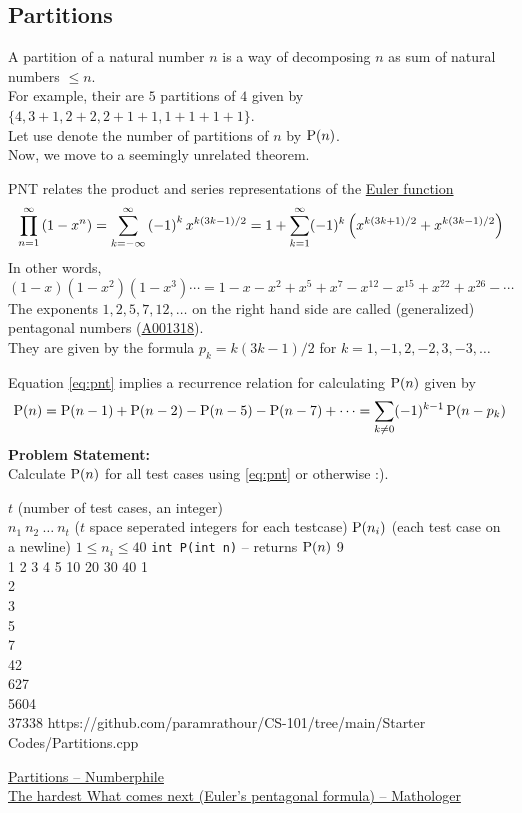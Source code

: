 \documentclass[../../Problems]{subfiles}
\begin{document}
\subsection{Partitions}
A partition of a natural number $n$ is a way of decomposing $n$ as sum of natural numbers $\leq n$.\\
For example, their are $5$ partitions of $4$ given by $\{4, 3+1, 2+2, 2+1+1, 1+1+1+1\}$.\\
Let use denote the number of partitions of $n$ by $\operatorname{P}(n)$.\\
Now, we move to a seemingly unrelated theorem.
\begin{theorem}
	PNT relates the product and series representations of the \href{https://en.wikipedia.org/wiki
	/Euler_function}{Euler function}
	\begin{equation}{\label{eq:pnt}}
		\prod_{n=1}^{\infty}\left(1-x^{n}\right)=\sum_{k=-\infty }^{\infty }\left(-1\right)^{k}x^{k\left(3k-1\right)/2}=1+\sum _{k=1}^{\infty }(-1)^{k}\left(x^{k(3k+1)/2}+x^{k(3k-1)/2}\right)
	\end{equation}
	In other words,
	\begin{equation*}
		(1-x)(1-x^{2})(1-x^{3})\cdots =1-x-x^{2}+x^{5}+x^{7}-x^{12}-x^{15}+x^{22}+x^{26}-\cdots
	\end{equation*}
	The exponents $1, 2, 5, 7, 12,\ldots$ on the right hand side are called (generalized) pentagonal numbers (\href{https://oeis.org/A001318}{A001318}).\\
	They are given by the formula $p_k = k(3k - 1)/2$ for $k = 1, -1, 2, -2, 3,-3,\ldots$
\end{theorem}
Equation \ref{eq:pnt} implies a recurrence relation for calculating $\operatorname{P}(n)$ given by
\begin{equation}
	\operatorname{P}(n)=\operatorname{P}(n-1)+\operatorname{P}(n-2)-\operatorname{P}(n-5)-\operatorname{P}(n-7)+\cdots = \sum_{k\neq 0}(-1)^{k-1}\operatorname{P}(n-p_{k})
\end{equation}
\textbf{Problem Statement:}\\
Calculate $\operatorname{P}(n)$ for all test cases using \ref{eq:pnt} or otherwise :).
\begin{testcasesFunction}
	{$t$ \hfill(number of test cases, an integer)\\
	$n_1\ n_2\ \ldots\ n_t$ \hfill($t$ space seperated integers for each testcase)}
	{$\operatorname{P}(n_i)$ \hfill(each test case on a newline)}
	{$1 \leq n_i \leq 40$}
	{\texttt{int P(int n)} -- returns $\operatorname{P}(n)$ }%
	{9\\1 2 3 4 5 10 20 30 40}
	{1\\2\\3\\5\\7\\42\\627\\5604\\37338}
	{https://github.com/paramrathour/CS-101/tree/main/Starter Codes/Partitions.cpp}
\end{testcasesFunction}
\begin{funvideo}
\href{https://youtu.be/NjCIq58rZ8I}{Partitions -- Numberphile}\\
\href{https://youtu.be/iJ8pnCO0nTY}{The hardest What comes next (Euler's pentagonal formula) -- Mathologer}
\end{funvideo}
\end{document}
